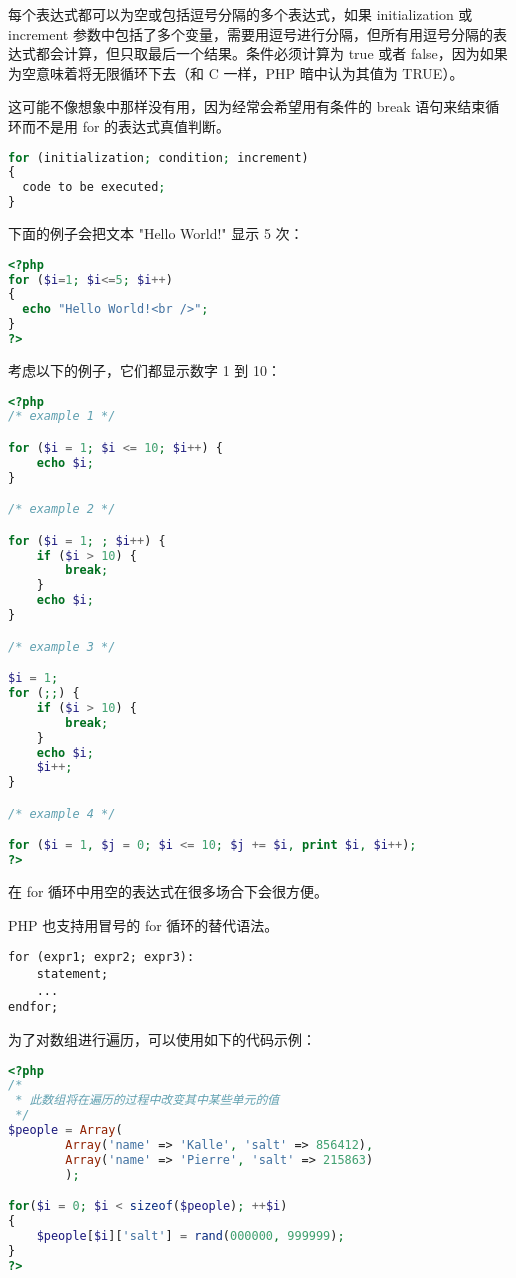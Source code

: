 每个表达式都可以为空或包括逗号分隔的多个表达式，如果 initialization 或 increment 参数中包括了多个变量，需要用逗号进行分隔，但所有用逗号分隔的表达式都会计算，但只取最后一个结果。条件必须计算为 true 或者 false，因为如果为空意味着将无限循环下去（和 C 一样，PHP 暗中认为其值为 TRUE）。

这可能不像想象中那样没有用，因为经常会希望用有条件的 break 语句来结束循环而不是用 for 的表达式真值判断。

\begin{lstlisting}[language=PHP]
for (initialization; condition; increment)
{
  code to be executed;
}
\end{lstlisting}

下面的例子会把文本 "Hello World!" 显示 5 次：

\begin{lstlisting}[language=PHP]
<?php
for ($i=1; $i<=5; $i++)
{
  echo "Hello World!<br />";
}
?>
\end{lstlisting}

考虑以下的例子，它们都显示数字 1 到 10：

\begin{lstlisting}[language=PHP]
<?php
/* example 1 */

for ($i = 1; $i <= 10; $i++) {
    echo $i;
}

/* example 2 */

for ($i = 1; ; $i++) {
    if ($i > 10) {
        break;
    }
    echo $i;
}

/* example 3 */

$i = 1;
for (;;) {
    if ($i > 10) {
        break;
    }
    echo $i;
    $i++;
}

/* example 4 */

for ($i = 1, $j = 0; $i <= 10; $j += $i, print $i, $i++);
?>
\end{lstlisting}


在 for 循环中用空的表达式在很多场合下会很方便。

PHP 也支持用冒号的 for 循环的替代语法。


\begin{verbatim}
for (expr1; expr2; expr3):
    statement;
    ...
endfor;
\end{verbatim}

为了对数组进行遍历，可以使用如下的代码示例：

\begin{lstlisting}[language=PHP]
<?php
/*
 * 此数组将在遍历的过程中改变其中某些单元的值
 */
$people = Array(
        Array('name' => 'Kalle', 'salt' => 856412), 
        Array('name' => 'Pierre', 'salt' => 215863)
        );

for($i = 0; $i < sizeof($people); ++$i)
{
    $people[$i]['salt'] = rand(000000, 999999);
}
?>
\end{lstlisting}

